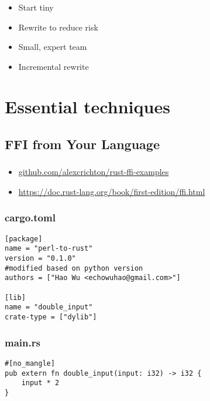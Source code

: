 \documentclass{beamer}
\begin{document}
\begin{frame}[fragile]
\frametitle{\insertsubsectionhead}
\begin{itemize}[<+(1)->]
\item Start tiny
\item Rewrite to reduce risk
\item Small, expert team
\item Incremental rewrite
\end{itemize}
\end{frame}


\section{Essential techniques}

\begin{frame}[fragile]
\tableofcontents [currentsection]
\end{frame}
\subsection{FFI from Your Language}

\begin{frame}[fragile]
\tableofcontents[currentsubsection]
\end{frame}


\begin{frame}[fragile]
\frametitle{\insertsubsectionhead}
\begin{itemize}[<+(1)->]
\item \url{github.com/alexcrichton/rust-ffi-examples}
\item \url{https://doc.rust-lang.org/book/first-edition/ffi.html}
\end{itemize}
\end{frame}



\begin{frame}[fragile]
\frametitle{cargo.toml}
\begin{verbatim}
[package]
name = "perl-to-rust"
version = "0.1.0"
#modified based on python version
authors = ["Hao Wu <echowuhao@gmail.com>"]

[lib]
name = "double_input"
crate-type = ["dylib"]
\end{verbatim}
\end{frame}


\begin{frame}[fragile]
\frametitle{main.rs}
\begin{verbatim}
#[no_mangle]
pub extern fn double_input(input: i32) -> i32 {
    input * 2
}
\end{verbatim}
\end{frame}
\end{document}
